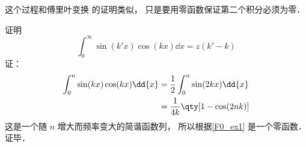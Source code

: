 这个过程和傅里叶变换 的证明类似， 只是要用零函数保证第二个积分必须为零．

\begin{example}{}
证明
\begin{equation}
\int_0^\infty \sin(k'x)\cos(kx) \dd{x} = z(k' - k)
\end{equation}
证：
\begin{equation}
\begin{aligned}
\int_0^n \sin(kx)\cos(kx) \dd{x} &= \frac{1}{2} \int_0^n \sin(2kx) \dd{x}\\
&= \frac{1}{4k} \qty[1 - \cos(2nk)]
\end{aligned}
\end{equation}
这是一个随 $n$ 增大而频率变大的简谐函数列， 所以根据\autoref{F0_ex1} 是一个零函数． 证毕．
\end{example}
